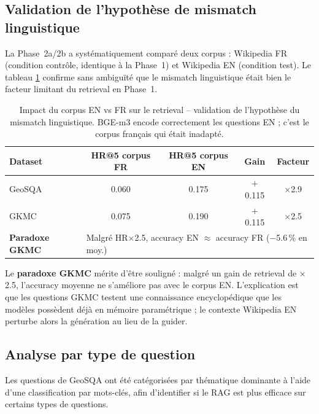 \documentclass[12pt,a4paper]{article}
\begin{document}
\subsection{Validation de l'hypothèse de mismatch linguistique}
\label{sec:validation_en}

La Phase~2a/2b a systématiquement comparé deux corpus : Wikipedia FR (condition
contrôle, identique à la Phase~1) et Wikipedia EN (condition test). Le tableau
\ref{tab:en_vs_fr} confirme sans ambiguïté que le mismatch linguistique était bien
le facteur limitant du retrieval en Phase~1.

\begin{table}[H]
\centering
\caption{Impact du corpus EN vs FR sur le retrieval -- validation de l'hypoth\`ese
  du mismatch linguistique. BGE-m3 encode correctement les questions EN ; c'est le
  corpus fran\c{c}ais qui \'etait inadapt\'e.}
\label{tab:en_vs_fr}
\begin{tabular}{@{} l c c c c @{}}
\toprule
\textbf{Dataset} & \textbf{HR@5 corpus FR} & \textbf{HR@5 corpus EN}
  & \textbf{Gain} & \textbf{Facteur} \\
\midrule
GeoSQA & 0.060 & 0.175 & $+$0.115 & $\times$2.9 \\
\rowcolor{lightgray}
GKMC   & 0.075 & 0.190 & $+$0.115 & $\times$2.5 \\
\midrule
\textbf{Paradoxe GKMC} & \multicolumn{4}{l}{Malgré HR$\times$2.5, accuracy EN $\approx$ accuracy FR ($-$5.6\,\% en moy.)} \\
\bottomrule
\end{tabular}
\end{table}

\noindent Le \textbf{paradoxe GKMC} mérite d'être souligné : malgré un gain de retrieval
de $\times$2.5, l'accuracy moyenne ne s'améliore pas avec le corpus EN. L'explication
est que les questions GKMC testent une connaissance encyclopédique que les modèles
possèdent déjà en mémoire paramétrique ; le contexte Wikipedia EN perturbe alors la
génération au lieu de la guider.

\subsection{Analyse par type de question}
\label{sec:type_question}

Les questions de GeoSQA ont \'et\'e cat\'egoris\'ees par th\'ematique dominante \`a l'aide
d'une classification par mots-cl\'es, afin d'identifier si le RAG est plus efficace sur
certains types de questions.
\end{document}
